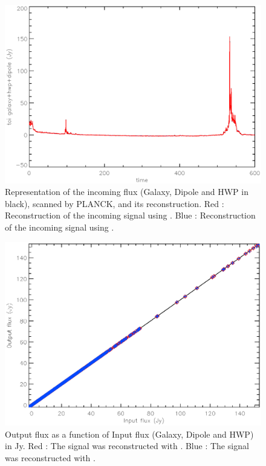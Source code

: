 \begin{figure}[h]
\center
	\includegraphics[scale=0.5]{Figures/toi-galaxy-hwp-dipole-planck.eps}
	\caption{Representation of the incoming flux (Galaxy, Dipole and HWP in black), scanned by PLANCK, and its reconstruction. Red : Reconstruction of the incoming signal using \cf. Blue : Reconstruction of the incoming signal using \rf. }
	\label{fig:toi-galaxy-hwp-dipole-planck}
\end{figure}

\begin{figure}[h]
\center
	\includegraphics[scale=0.5]{Figures/NL-galaxy-hwp-dipole-planck.eps}
	\caption{Output flux as a function of Input flux (Galaxy, Dipole and HWP) in Jy. Red : The signal was reconstructed with \cf. Blue : The signal was reconstructed with \rf.}
	\label{fig:nl-galaxy-hwp-dipole-planck}
\end{figure}

